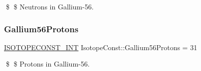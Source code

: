 \$ \$ Neutrons in Gallium-\/56. \mbox{\label{group___isotope_const-_gallium-_ga56_ga5f3bf03104609129032abf87c1710e18}} 
\subsubsection{\texorpdfstring{Gallium56\+Protons}{Gallium56Protons}}
{\footnotesize\ttfamily \mbox{\hyperlink{group___isotope_const-_macros_ga5f18360b3e99483a35c32d789e62621c}{I\+S\+O\+T\+O\+P\+E\+C\+O\+N\+S\+T\+\_\+\+I\+NT}} Isotope\+Const\+::\+Gallium56\+Protons = 31}

\$ \$ Protons in Gallium-\/56. 